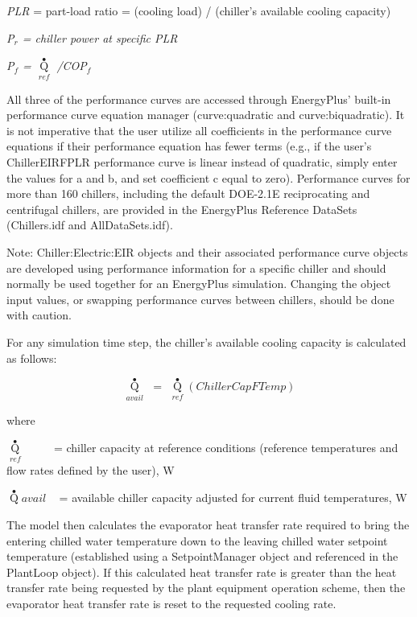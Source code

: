 \emph{PLR} = part-load ratio = (cooling load) / (chiller's available cooling capacity)

\emph{P\(_{r}\) = chiller power at specific PLR}

\emph{P\(_{f}\) = \({\mathop Q\limits^ \bullet_{ref}}\) /COP\(_{f}\)}

All three of the performance curves are accessed through EnergyPlus' built-in performance curve equation manager (curve:quadratic and curve:biquadratic). It is not imperative that the user utilize all coefficients in the performance curve equations if their performance equation has fewer terms (e.g., if the user's ChillerEIRFPLR performance curve is linear instead of quadratic, simply enter the values for a and b, and set coefficient c equal to zero). Performance curves for more than 160 chillers, including the default DOE-2.1E reciprocating and centrifugal chillers, are provided in the EnergyPlus Reference DataSets (Chillers.idf and AllDataSets.idf).

Note: Chiller:Electric:EIR objects and their associated performance curve objects are developed using performance information for a specific chiller and should normally be used together for an EnergyPlus simulation. Changing the object input values, or swapping performance curves between chillers, should be done with caution.

For any simulation time step, the chiller's available cooling capacity is calculated as follows:

\begin{equation}
{\mathop Q\limits^ \bullet_{avail}}\,\, = \,\,{\mathop Q\limits^ \bullet_{ref}}\left( {ChillerCapFTemp} \right)
\end{equation}

where

\({\mathop Q\limits^ \bullet_{ref}}\) ~~~~ = chiller capacity at reference conditions (reference temperatures and flow rates defined by the user), W

\(\mathop Q\limits^ \bullet avail\) ~ = available chiller capacity adjusted for current fluid temperatures, W

The model then calculates the evaporator heat transfer rate required to bring the entering chilled water temperature down to the leaving chilled water setpoint temperature (established using a SetpointManager object and referenced in the PlantLoop object). If this calculated heat transfer rate is greater than the heat transfer rate being requested by the plant equipment operation scheme, then the evaporator heat transfer rate is reset to the requested cooling rate.

